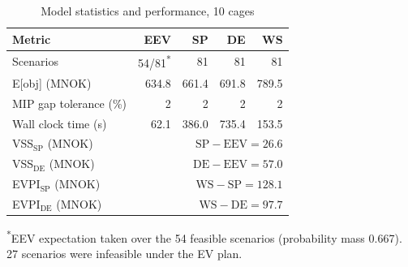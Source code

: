\documentclass[12pt,a4paper]{article}
\begin{document}
\begin{table}[htbp]
\centering
\caption{Model statistics and performance, 10 cages}
\label{tab:model_stats_10cages}
\footnotesize
\begin{tabularx}{\linewidth}{lRRRR}
\toprule
\textbf{Metric} & \textbf{EEV} & \textbf{SP} & \textbf{DE} & \textbf{WS} \\
\midrule
Scenarios              & 54/81\textsuperscript{*} & 81 & 81 & 81 \\
E[obj] (MNOK)          & 634.8       & 661.4         & 691.8       & 789.5 \\
MIP gap tolerance (\%) & 2           & 2             & 2           & 2 \\
Wall clock time (s)    & 62.1        & 386.0         & 735.4       & 153.5 \\
\midrule
VSS$_{\text{SP}}$ (MNOK)  &  \\
VSS$_{\text{DE}}$ (MNOK)  &  \\
EVPI$_{\text{SP}}$ (MNOK) &  \\
EVPI$_{\text{DE}}$ (MNOK) &  \\
\bottomrule
\end{tabularx}
\par\vspace{2pt}
\footnotesize\textsuperscript{*}EEV expectation taken over the 54 feasible scenarios (probability mass 0.667). 27 scenarios were infeasible under the EV plan.
\end{table}
\end{document}
